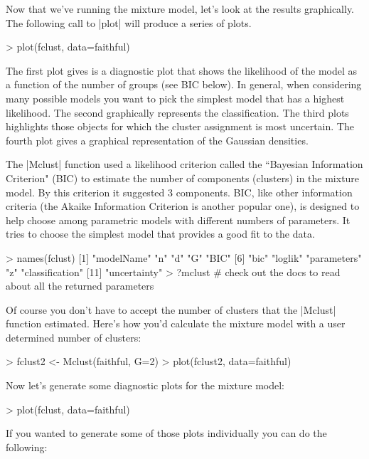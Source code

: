 \documentclass[10pt,letterpaper]{article}
\begin{document}
Now that we've running the mixture model, let's look at the results graphically. The following call to |plot| will produce a series of plots.

\begin{Code}
> plot(fclust, data=faithful)    
\end{Code}

The first plot gives is a diagnostic plot that shows the likelihood of the model as a function of  the number of groups (see BIC below). In general, when considering many possible models you want to pick the simplest model that has a highest likelihood. The second graphically represents the classification. The third plots highlights those objects for which the cluster assignment is most uncertain. The fourth plot gives a graphical representation of the Gaussian densities.

The |Mclust| function used a likelihood criterion called the ``Bayesian Information Criterion" (BIC) to estimate the number of components (clusters) in the mixture model. By this criterion it suggested 3 components. BIC, like other information criteria (the Akaike Information Criterion is another popular one), is designed to help choose among parametric models with different numbers of parameters. It tries to choose the simplest model that provides a good fit to the data.

\begin{Code}
> names(fclust)
 [1] "modelName"      "n"              "d"              "G"              "BIC"           
 [6] "bic"            "loglik"         "parameters"     "z"              "classification"
[11] "uncertainty"
> ?mclust  # check out the docs to read about all the returned parameters
\end{Code}

Of course you don't have to accept the number of clusters that the |Mclust| function estimated. Here's how you'd calculate the mixture model with a user determined number of clusters:

\begin{Code}
> fclust2 <- Mclust(faithful, G=2)
> plot(fclust2, data=faithful)    
\end{Code}

Now let's generate some diagnostic plots for the mixture model:

\begin{Code}
> plot(fclust, data=faithful)    
\end{Code}

If you wanted to generate some of those plots individually you can do the following:
\end{document}

